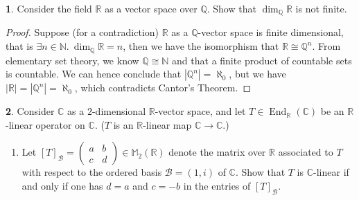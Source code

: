 \documentclass{article}
\theoremstyle{definition}
\newtheorem{problem}{}
\numberwithin{lemma}{problem}
\numberwithin{equation}{problem}
\newcommand{\N}{\mathbb{N}}
\newcommand{\R}{\mathbb{R}}
\newcommand{\Q}{\mathbb{Q}}
\newcommand{\C}{\mathbb{C}}
\newcommand{\M}{\mathbb{M}}
\newcommand{\B}{\mathcal{B}}
\DeclareMathOperator{\End}{End}
\begin{document}
\newpage
\begin{problem}
    Consider the field $\R$ as a vector space over $\Q$.
    Show that $\dim_\Q \R$ is not finite.
\end{problem}
\begin{proof}
    Suppose (for a contradiction) $\R$ as a $\Q$-vector space is finite dimensional,
    that is $\exists n\in \N.~ \dim_\Q \R = n$,
    then we have the isomorphism that $\R \cong \Q^n$.
    From elementary set theory, we know $\Q \cong \N$ and that
    a finite product of countable sets is countable.
    We can hence conclude that $|\Q^n| = \aleph_0$,
    but we have $|\R| = |\Q^n| = \aleph_0$, which contradicts Cantor's Theorem.
\end{proof}

\newpage
\begin{problem}
    Consider $\C$ as a $2$-dimensional $\R$-vector space, and
    let $T\in \End_\R(\C)$ be an $\R$-linear operator on $\C$.
    ($T$ is an $\R$-linear map $\C \to \C$.)
\end{problem}
\begin{enumerate}[label=(\alph*)]
    \item Let $[T]_\B = \begin{pmatrix} a&b\\c&d \end{pmatrix} \in \M_2(\R)$
        denote the matrix over $\R$ associated to $T$
        with respect to the ordered basis $\B = (1,i)$ of $\C$.
        Show that $T$ is $\C$-linear if and only if
        one has $d = a$ and $c = -b$ in the entries of $[T]_\B$.
\end{enumerate}
\end{document}
